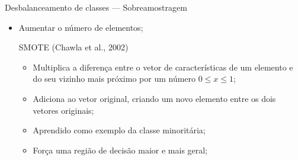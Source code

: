 \documentclass{beamer}
\begin{document}
\begin{frame}{Desbalanceamento de classes --- Sobreamostragem}
  \setlength\leftmargini{1em}
  \justifying
  \begin{itemize}
    \item Aumentar o número de elementos;
    \begin{block}{SMOTE (Chawla et al., 2002)}
      \setlength\leftmargini{1em}
      \begin{itemize}
        \item Multiplica a diferença entre o vetor de características de um elemento e do seu vizinho mais próximo por um número $0 \leq x \leq 1$;
        \item Adiciona ao vetor original, criando um novo elemento entre os dois vetores originais;
        \item Aprendido como exemplo da classe minoritária;
        \item Força uma região de decisão maior e mais geral;
      \end{itemize}
    \end{block}
  \end{itemize}
\end{frame}
%
\end{document}
